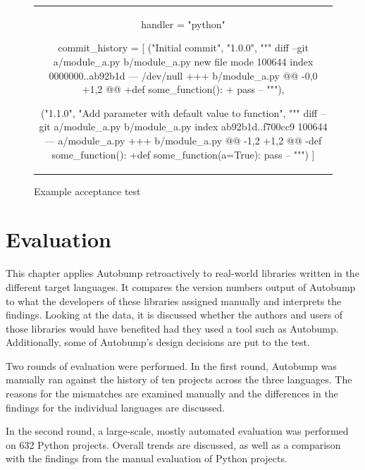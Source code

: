 \documentclass{l4proj}
\begin{document}
\begin{figure}[H]
\caption{Example acceptance test}
\label{ExampleAcceptanceTest}
\begin{center}
\begin{tabular}{c}
\begin{python}
handler = "python"

commit_history = [
    ("Initial commit", "1.0.0",
     """
     diff --git a/module_a.py b/module_a.py
     new file mode 100644
     index 0000000..ab92b1d
     --- /dev/null
     +++ b/module_a.py
     @@ -0,0 +1,2 @@
     +def some_function():
     +    pass
     --
     """),

    ("1.1.0", "Add parameter with default value to function",
     """
     diff --git a/module_a.py b/module_a.py
     index ab92b1d..f700cc9 100644
     --- a/module_a.py
     +++ b/module_a.py
     @@ -1,2 +1,2 @@
     -def some_function():
     +def some_function(a=True):
     pass
     --
     """)
]
\end{python}
\end{tabular}
\end{center}
\end{figure}

\chapter{Evaluation}
\label{Evaluation}

This chapter applies Autobump retroactively to real-world libraries
written in the different target languages. It compares the version
numbers output of Autobump to what the developers of these libraries
assigned manually and interprets the findings. Looking at the data, it
is discussed whether the authors and users of those libraries would
have benefited had they used a tool such as Autobump. Additionally,
some of Autobump's design decisions are put to the test.

Two rounds of evaluation were performed. In the first round, Autobump
was manually ran against the history of ten projects across the
three languages. The reasons for the mismatches are examined manually
and the differences in the findings for the individual languages are
discussed.

In the second round, a large-scale, mostly automated evaluation was
performed on 632 Python projects. Overall trends are discussed, as
well as a comparison with the findings from the manual evaluation of
Python projects.
\end{document}
